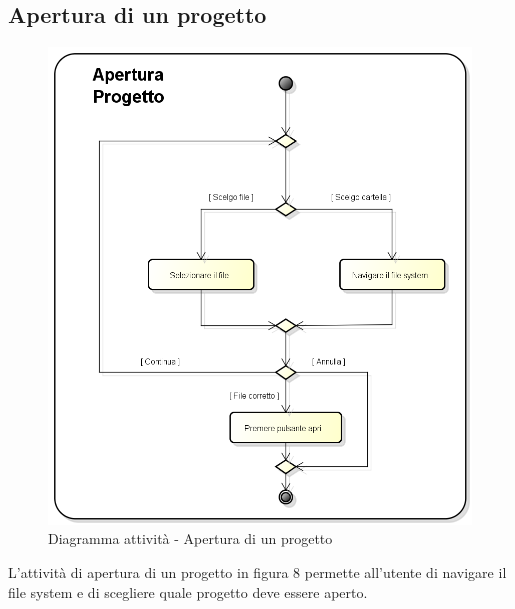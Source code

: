 \subsection{Apertura di un progetto}
\begin{figure}[h] 
	\centering 
	\includegraphics[scale=0.3] {img/activity_apertura.png} 
	\caption{Diagramma attività - Apertura di un progetto} 
\end{figure}
L'attività di apertura di un progetto in figura 8 permette all'utente di navigare il file system e di scegliere quale progetto deve essere aperto.
\newpage

